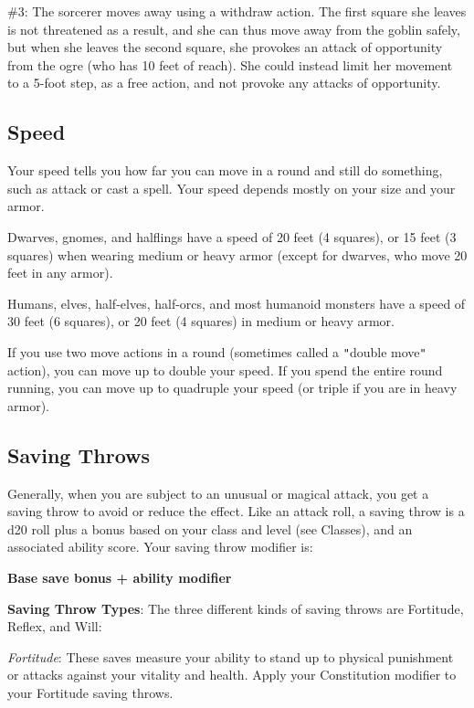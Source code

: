 \#3: The sorcerer moves away using a withdraw action. The first square she leaves is not threatened as a result, and she can thus move away from the goblin safely, but when she leaves the second square, she provokes an attack of opportunity from the ogre (who has 10 feet of reach). She could instead limit her movement to a 5-foot step, as a free action, and not provoke any attacks of opportunity.

				
\subsection{Speed}

				
Your speed tells you how far you can move in a round and still do something, such as attack or cast a spell. Your speed depends mostly on your size and your armor.
				
Dwarves, gnomes, and halflings have a speed of 20 feet (4 squares), or 15 feet (3 squares) when wearing medium or heavy armor (except for dwarves, who move 20 feet in any armor).
				
Humans, elves, half-elves, half-orcs, and most humanoid monsters have a speed of 30 feet (6 squares), or 20 feet (4 squares) in medium or heavy armor.
				
If you use two move actions in a round (sometimes called a \texttt{{}"{}}double move\texttt{{}"{}} action), you can move up to double your speed. If you spend the entire round running, you can move up to quadruple your speed (or triple if you are in heavy armor). 
				
\subsection{Saving Throws}

				
Generally, when you are subject to an unusual or magical attack, you get a saving throw to avoid or reduce the effect. Like an attack roll, a saving throw is a d20 roll plus a bonus based on your class and level (see Classes), and an associated ability score. Your saving throw modifier is:
				
{\large \textbf{Base save bonus + ability modifier}}
				
\textbf{Saving Throw Types}: The three different kinds of saving throws are Fortitude, Reflex, and Will:
				
\textit{Fortitude}: These saves measure your ability to stand up to physical punishment or attacks against your vitality and health. Apply your Constitution modifier to your Fortitude saving throws. 
				
